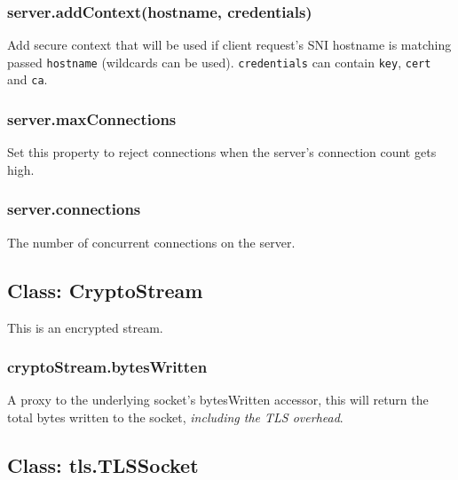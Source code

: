 \subsubsection{server.addContext(hostname,
credentials)}\label{server.addcontexthostname-credentials}

Add secure context that will be used if client request's SNI hostname is
matching passed \texttt{hostname} (wildcards can be used).
\texttt{credentials} can contain \texttt{key}, \texttt{cert} and
\texttt{ca}.

\subsubsection{server.maxConnections}\label{server.maxconnections}

Set this property to reject connections when the server's connection
count gets high.

\subsubsection{server.connections}\label{server.connections}

The number of concurrent connections on the server.

\subsection{Class: CryptoStream}\label{class-cryptostream}

\begin{Shaded}
\begin{Highlighting}[]
 \NormalTok{- }  
\end{Highlighting}
\end{Shaded}

This is an encrypted stream.

\subsubsection{cryptoStream.bytesWritten}\label{cryptostream.byteswritten}

A proxy to the underlying socket's bytesWritten accessor, this will
return the total bytes written to the socket, \emph{including the TLS
overhead}.

\subsection{Class: tls.TLSSocket}\label{class-tls.tlssocket-1}

